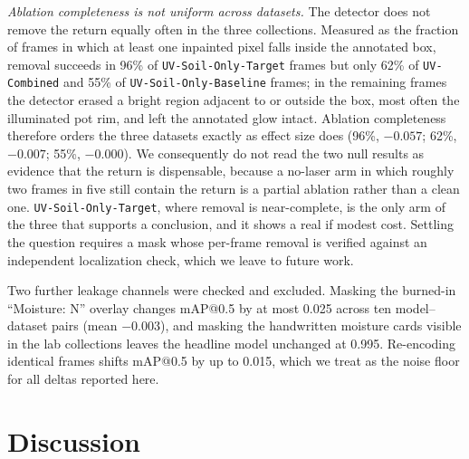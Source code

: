 ﻿\documentclass[journal]{IEEEtran}
\begin{document}
\emph{Ablation completeness is not uniform across datasets.} The detector does not remove the return equally often in the three collections. Measured as the fraction of frames in which at least one inpainted pixel falls inside the annotated box, removal succeeds in 96\% of \texttt{UV-Soil-Only-Target} frames but only 62\% of \texttt{UV-Combined} and 55\% of \texttt{UV-Soil-Only-Baseline} frames; in the remaining frames the detector erased a bright region adjacent to or outside the box, most often the illuminated pot rim, and left the annotated glow intact. Ablation completeness therefore orders the three datasets exactly as effect size does (96\%, $-0.057$; 62\%, $-0.007$; 55\%, $-0.000$). We consequently do not read the two null results as evidence that the return is dispensable, because a no-laser arm in which roughly two frames in five still contain the return is a partial ablation rather than a clean one. \texttt{UV-Soil-Only-Target}, where removal is near-complete, is the only arm of the three that supports a conclusion, and it shows a real if modest cost. Settling the question requires a mask whose per-frame removal is verified against an independent localization check, which we leave to future work.

Two further leakage channels were checked and excluded. Masking the burned-in ``Moisture: N'' overlay changes mAP@0.5 by at most 0.025 across ten model--dataset pairs (mean $-0.003$), and masking the handwritten moisture cards visible in the lab collections leaves the headline model unchanged at 0.995. Re-encoding identical frames shifts mAP@0.5 by up to 0.015, which we treat as the noise floor for all deltas reported here.

\section{Discussion}
\label{sec:discussion}
\end{document}
